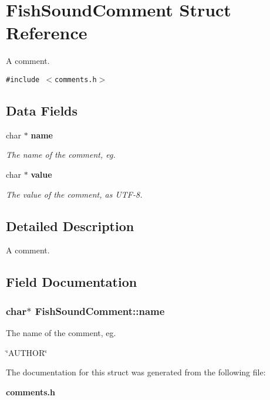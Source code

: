 \section{Fish\-Sound\-Comment Struct Reference}
\label{structFishSoundComment}
A comment.  


{\tt \#include $<$comments.h$>$}

\subsection*{Data Fields}
\begin{CompactItemize}
\item 
char $\ast$ {\bf name}
\begin{CompactList}\small\item\em The name of the comment, eg. \item\end{CompactList}\item 
char $\ast$ {\bf value}\label{structFishSoundComment_o1}

\begin{CompactList}\small\item\em The value of the comment, as UTF-8. \item\end{CompactList}\end{CompactItemize}


\subsection{Detailed Description}
A comment. 



\subsection{Field Documentation}
\subsubsection{\setlength{\rightskip}{0pt plus 5cm}char$\ast$ {\bf Fish\-Sound\-Comment::name}}\label{structFishSoundComment_o0}


The name of the comment, eg. 

\char`\"{}AUTHOR\char`\"{} 

The documentation for this struct was generated from the following file:\begin{CompactItemize}
\item 
{\bf comments.h}\end{CompactItemize}
